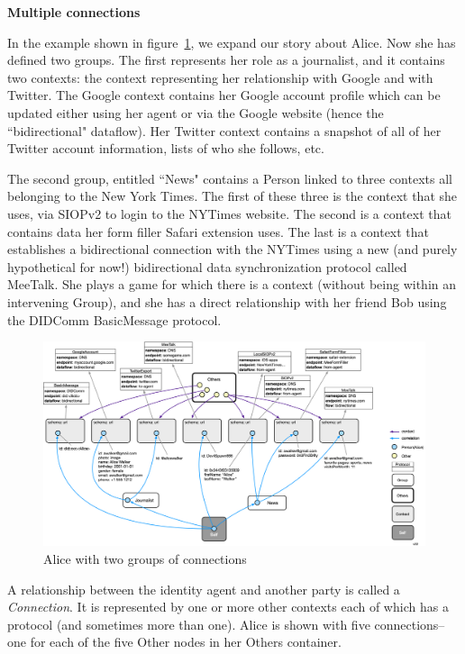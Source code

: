 \documentclass[11pt, oneside]{article}   	%
\begin{document}
\textbf{Multiple connections}

In the example shown in figure~\ref{fig:groups}, we expand our story about Alice. Now she has defined two groups. The first represents her role as a journalist, and it contains two contexts: the context representing her relationship with Google and with Twitter. The Google context contains her Google account profile which can be updated either using her agent or via the Google website (hence the ``bidirectional" dataflow). Her Twitter context contains a snapshot of all of her Twitter account information, lists of who she follows, etc. 

The second group, entitled ``News" contains a Person linked to three contexts all belonging to the New York Times. The first of these three is the context that she uses, via SIOPv2 to login to the NYTimes website. The second is a context that contains data her form filler Safari extension uses. The last is a context that establishes a bidirectional connection with the NYTimes using a new (and purely hypothetical for now!) bidirectional data synchronization protocol called MeeTalk. She plays a game for which there is a context (without being within an intervening Group), and she has a direct relationship with her friend Bob using the DIDComm BasicMessage protocol.  

\begin{figure}[htbp]
\includegraphics[width=\textwidth]{./images/multiple-connections.png}
\caption{Alice with two groups of connections}
\label{fig:groups}
\end{figure}

A relationship between the identity agent and another party is called a \emph{Connection}. It is represented by one or more other contexts each of which has a protocol (and sometimes more than one). Alice is shown with five connections--one for each of the five Other nodes in her Others container. 
\end{document}
